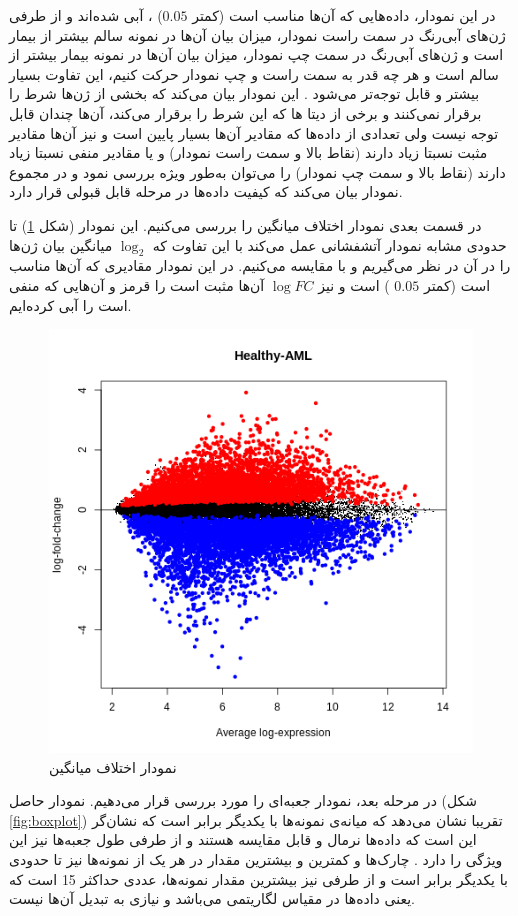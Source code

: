 \documentclass{article}
\begin{document}
در این نمودار، داده‌هایی که 
آن‌ها مناسب است (کمتر 
$0.05$)
،
آبی شده‌اند و از طرفی ژن‌های آبی‌رنگ در سمت راست نمودار، میزان بیان آن‌ها در نمونه سالم بیشتر از بیمار است و ژن‌های آبی‌رنگ در سمت چپ نمودار، میزان بیان آن‌ها در نمونه بیمار بیشتر از سالم است و هر چه قدر به سمت راست و چپ نمودار حرکت کنیم، این تفاوت بسیار بیشتر و قابل توجه‌تر می‌شود . 
این نمودار بیان می‌کند که بخشی از ژن‌ها شرط 
را برقرار نمی‌کنند و برخی از دیتا ها که این شرط را برقرار می‌کند، 
آن‌ها چندان قابل توجه نیست  ولی تعدادی از داده‌ها که مقادیر 
آن‌ها بسیار پایین است و نیز 
آن‌ها مقادیر مثبت نسبتا زیاد دارند (نقاط بالا و سمت راست نمودار) و یا مقادیر منفی نسبتا زیاد دارند (نقاط بالا و سمت چپ نمودار) را می‌توان به‌طور ویژه بررسی نمود و در مجموع نمودار بیان می‌کند که کیفیت داده‌ها در مرحله قابل قبولی قرار دارد.

در قسمت بعدی نمودار اختلاف میانگین
را بررسی می‌کنیم. این نمودار (شکل \ref{fig:md}) تا حدودی مشابه نمودار آتشفشانی عمل می‌کند با این تفاوت که 
$\log_2$
میانگین بیان ژن‌ها را در آن در نظر می‌گیریم و با 
مقایسه می‌کنیم. در این نمودار  مقادیری  که 
آن‌ها مناسب است (کمتر 
$0.05$
)
است و نیز 
$\log FC$
آن‌ها مثبت است را قرمز و آن‌هایی که منفی است را آبی کرده‌ایم.

\begin{figure}[h!]
	\centering
	\includegraphics[width=0.5\columnwidth]{figs/md.png}
	\caption{نمودار اختلاف میانگین}
	\label{fig:md}
\end{figure}

در مرحله بعد، نمودار جعبه‌ای را مورد بررسی قرار می‌دهیم. نمودار حاصل (شکل \ref{fig:boxplot}) تقریبا نشان می‌دهد که میانه‌ی نمونه‌ها با یکدیگر برابر است که نشان‌گر این است که داده‌ها نرمال و قابل مقایسه هستند و از طرفی طول جعبه‌ها نیز این ویژگی را دارد . چارک‌ها و کمترین و بیشترین مقدار در هر یک از نمونه‌‌ها نیز تا حدودی با یکدیگر برابر است و از طرفی نیز بیشترین مقدار نمونه‌ها، عددی حداکثر 15 است که یعنی داده‌ها در مقیاس لگاریتمی می‌باشد و نیازی به تبدیل آن‌ها نیست.
\end{document}
